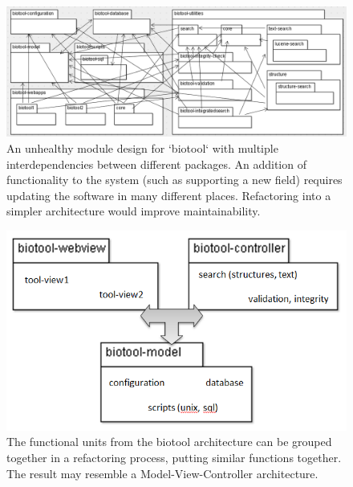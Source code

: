 \documentclass{bmcart}
\begin{document}
\begin{backmatter}
\begin{figure}[h!]%
\includegraphics[width=\columnwidth]{ComplexClassDiagram.png}%
\caption{An unhealthy module design for `biotool` with multiple interdependencies between different packages. An addition of functionality to the system (such as supporting a new field) requires updating the software in many different places. Refactoring into a simpler architecture would improve maintainability.}%
\label{fig-spaghetti}%
\end{figure}

\begin{figure}[h!]%
\includegraphics[width=\columnwidth]{SimpleClassDiagram.png}%
\caption{The functional units from the biotool architecture can be grouped together in a refactoring process, putting similar functions together. The result may resemble a Model-View-Controller architecture.}%
\label{fig-not-spaghetti}%
\end{figure}



\end{backmatter}
\end{document}
